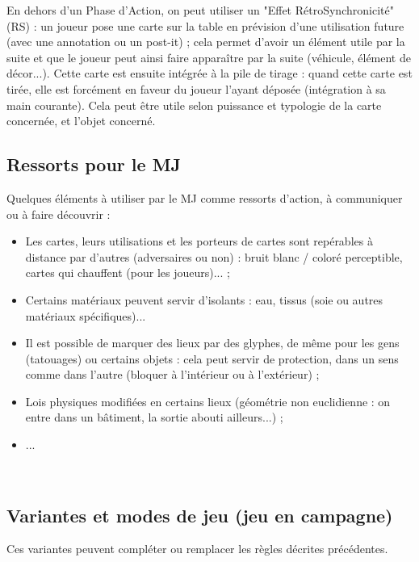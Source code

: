 \documentclass[11pt,twoside,a4paper]{article}
\begin{document}
En dehors d'un Phase d'Action, on peut utiliser un "Effet R{\'e}troSynchronicit{\'e}" (RS) : un joueur pose une carte sur la table en pr{\'e}vision d'une utilisation future (avec une annotation ou un post-it) ; cela permet d'avoir un {\'e}l{\'e}ment utile par la suite et que le joueur peut ainsi faire appara{\^i}tre par la suite (v{\'e}hicule, {\'e}l{\'e}ment de d{\'e}cor...). Cette carte est ensuite int{\'e}gr{\'e}e {\`a} la pile de tirage : quand cette carte est tir{\'e}e, elle est forc{\'e}ment en faveur du joueur l'ayant d{\'e}pos{\'e}e (int{\'e}gration {\`a} sa main courante). Cela peut {\^e}tre utile selon puissance et typologie de la carte concern{\'e}e, et l'objet concern{\'e}.~\\

\subsection{Ressorts pour le MJ}

Quelques {\'e}l{\'e}ments {\`a} utiliser par le MJ comme ressorts d'action, {\`a} communiquer ou {\`a} faire d{\'e}couvrir : 
\begin{itemize}
	\item Les cartes, leurs utilisations et les porteurs de cartes sont rep{\'e}rables {\`a} distance par d'autres (adversaires ou non) : bruit blanc / color{\'e} perceptible, cartes qui chauffent (pour les joueurs)... ; 
	\item Certains mat{\'e}riaux peuvent servir d'isolants : eau, tissus (soie ou autres mat{\'e}riaux sp{\'e}cifiques)...
	\item Il est possible de marquer des lieux par des glyphes, de m{\^e}me pour les gens (tatouages) ou certains objets : cela peut servir de protection, dans un sens comme dans l'autre (bloquer {\`a} l'int{\'e}rieur ou {\`a} l'ext{\'e}rieur) ; 
	\item Lois physiques modifiées en certains lieux (géométrie non euclidienne : on entre dans un bâtiment, la sortie abouti ailleurs...) ; 
	\item ... 
\end{itemize}~\\

\subsection{Variantes et modes de jeu (jeu en campagne)}

Ces variantes peuvent compl{\'e}ter ou remplacer les r{\`e}gles d{\'e}crites pr{\'e}c{\'e}dentes.~\\
\end{document}
